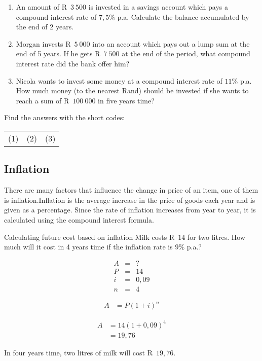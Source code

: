 \begin{exercises}{}{
    \begin{enumerate}[label=\textbf{\arabic*}.]
	\item An amount of R~$3~500$ is invested in a savings account which pays a compound interest rate of $7,5\%$ p.a. Calculate the balance accumulated by the end of 2 years.

	\item Morgan invests R~$5~000$ into an account which pays out a lump sum at the end of 5 years. If he gets R~$7~500$ at the end of the period, what compound interest rate did the bank offer him?

	\item Nicola wants to invest some money at a compound interest rate of $11\%$ p.a. How much money (to the nearest Rand) should be invested if she wants to reach a sum of R~$100~000$ in five years time?\\
    \end{enumerate}
\practiceinfo
    Find the answers with the short codes:\\
    \begin{tabularx}{\textwidth}{ XXX }
	(1)	&	(2)	&	(3)\\
    \end{tabularx}
}
\end{exercises}


\subsection{Inflation}

There are many factors that influence the change in price of an item, one of them is inflation.Inflation is the average increase in the price of goods each year and is given as a percentage. Since the rate of inflation increases from year to year, it is calculated using the compound interest formula.


\begin{wex}{Calculating future cost based on inflation}
    {Milk costs R~$14$ for two litres. How much will it cost in 4 years time if the inflation rate is $9\%$ p.a.?}{
    
    \begin{eqnarray*}
	A &=& ?\\
	P &=& 14\\
	i &=& 0,09\\
	n &=& 4
    \end{eqnarray*}

    \begin{align*}
	A &= P(1 + i)^n
    \end{align*}

    \begin{align*}
	A &= 14(1 + 0,09)^4\\
	  &= 19,76
    \end{align*}

    In four years time, two litres of milk will cost R~$19,76$.
    }
\end{wex}


